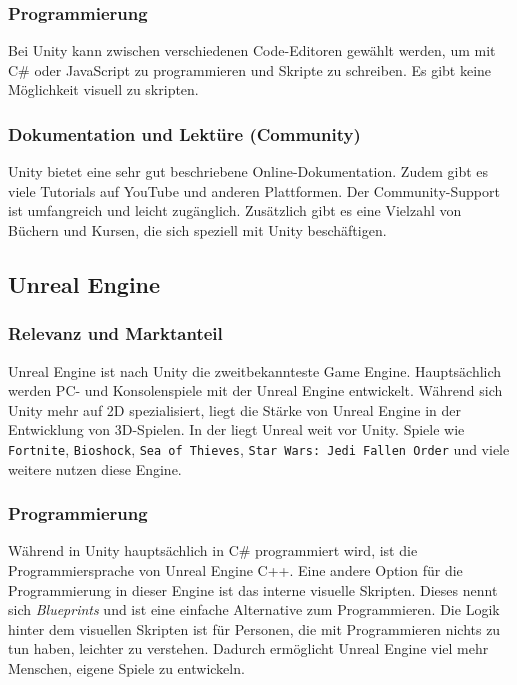 \subsubsection{Programmierung}
Bei Unity kann zwischen verschiedenen Code-Editoren gewählt werden, um mit C\# oder JavaScript zu programmieren und Skripte zu schreiben. Es gibt keine Möglichkeit visuell zu skripten.

\subsubsection{Dokumentation und Lektüre (Community)}
Unity bietet eine sehr gut beschriebene Online-Dokumentation. Zudem gibt es viele Tutorials auf YouTube und anderen Plattformen. Der Community-Support ist umfangreich und leicht zugänglich. Zusätzlich gibt es eine Vielzahl von Büchern und Kursen, die sich speziell mit Unity beschäftigen.

\pagebreak

\subsection{Unreal Engine}
\subsubsection{Relevanz und Marktanteil}
Unreal Engine ist nach Unity die zweitbekannteste Game Engine. Hauptsächlich werden PC- und Konsolenspiele mit der Unreal Engine entwickelt. Während sich Unity mehr auf 2D spezialisiert, liegt die Stärke von Unreal Engine in der Entwicklung von 3D-Spielen. In der  liegt Unreal weit vor Unity. Spiele wie \verb+Fortnite+, \verb+Bioshock+, \verb+Sea of Thieves+, \verb+Star Wars: Jedi Fallen Order+ und viele weitere nutzen diese Engine.

\subsubsection{Programmierung}
Während in Unity hauptsächlich in C\# programmiert wird, ist die Programmiersprache von Unreal Engine C++. Eine andere Option für die Programmierung in dieser Engine ist das interne visuelle Skripten. Dieses nennt sich \textit{Blueprints} und ist eine einfache Alternative zum Programmieren. Die Logik hinter dem visuellen Skripten ist für Personen, die mit Programmieren nichts zu tun haben, leichter zu verstehen. Dadurch ermöglicht Unreal Engine viel mehr Menschen, eigene Spiele zu entwickeln.

